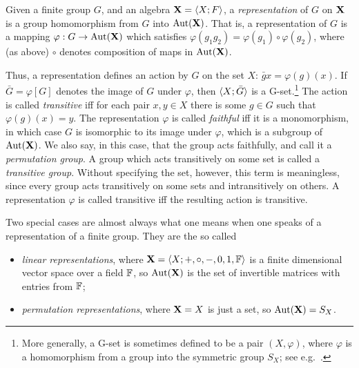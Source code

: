 Given a finite group $G$, and an algebra $\mathbf{X} = \langle X; F\rangle$, a
\emph{representation} of $G$ on $\mathbf{X}$ is a group homomorphism
from $G$ into $\mathrm{Aut}(\mathbf{X})$.  That is, a representation of $G$ is a mapping
$\varphi : G \rightarrow \mathrm{Aut}(\mathbf{X})$ which satisfies $\varphi(g_1 g_2) =
\varphi(g_1) \circ \varphi(g_2)$, where (as above) $\circ$ denotes composition
of maps in $\mathrm{Aut}(\mathbf{X})$.

Thus, a representation defines an action by $G$ on the set $X$: $\bar{g} x =
\varphi(g)(x)$.  If $\bar{G} = \varphi[G]$ denotes the image of $G$ under
$\varphi$, then $\langle X; \bar{G}\rangle$ is a G-set.\footnote{More generally, a G-set is
  sometimes defined to be a pair $(X, \varphi)$, where $\varphi$ is a homomorphism from
  a group into the symmetric group $S_X$; see e.g.~\cite{Suzuki:1982}.}  
The action is called
\emph{transitive} iff for each pair $x, y \in X$ there is some $g\in G$ such
that $\varphi(g)(x) = y$. The representation $\varphi$ is called \emph{faithful}
iff it is a monomorphism, in which case $G$ is isomorphic to its image under
$\varphi$, which is a subgroup of $\mathrm{Aut}(\mathbf{X})$.  We also say, in this case, that
the group acts faithfully, and call it a \emph{permutation group}.
A group which acts transitively on some set is called a \emph{transitive group}.
Without specifying the set, however, this term is meaningless, since
every group acts transitively on some sets and intransitively on others.  
A representation $\varphi$ is called transitive iff the resulting action is transitive.

Two special cases are almost always what one means when one speaks of a
representation of a finite group.  They are the so called
\begin{itemize}
\item \emph{linear representations}, where $\mathbf{X} = \langle X; +, \circ, -, 0, 1, \mathbb{F}\rangle$ is a finite dimensional vector
  space over a field $\mathbb{F}$, so $\mathrm{Aut}(\mathbf{X})$ is the set of invertible matrices with entries from $\mathbb{F}$;
\item \emph{permutation representations}, where $\mathbf{X} = X$ is just a set, so $\mathrm{Aut}(\mathbf{X}) = S_X$.
\end{itemize}

